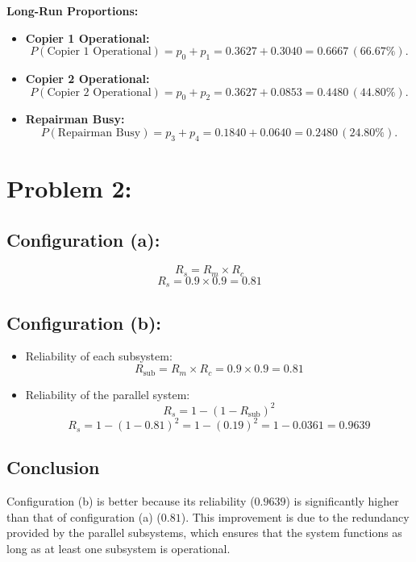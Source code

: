 \documentclass[12pt]{article}
\begin{document}
\textbf{Long-Run Proportions:}
\begin{itemize}
    \item \textbf{Copier 1 Operational:}
    \[
    P(\text{Copier 1 Operational}) = p_0 + p_1 = 0.3627 + 0.3040 = 0.6667 \, (66.67\%).
    \]
    \item \textbf{Copier 2 Operational:}
    \[
    P(\text{Copier 2 Operational}) = p_0 + p_2 = 0.3627 + 0.0853 = 0.4480 \, (44.80\%).
    \]
    \item \textbf{Repairman Busy:}
    \[
    P(\text{Repairman Busy}) = p_3 + p_4 = 0.1840 + 0.0640 = 0.2480 \, (24.80\%).
    \]
\end{itemize}

\section*{Problem 2:}

\subsection*{Configuration (a):}
\[
R_s = R_m \times R_c
\]
\[
R_s = 0.9 \times 0.9 = 0.81
\]

\subsection*{Configuration (b):}
\begin{itemize}
    \item Reliability of each subsystem:
    \[
    R_{\text{sub}} = R_m \times R_c = 0.9 \times 0.9 = 0.81
    \]
    \item Reliability of the parallel system:
    \[
    R_s = 1 - (1 - R_{\text{sub}})^2
    \]
    \[
    R_s = 1 - (1 - 0.81)^2 = 1 - (0.19)^2 = 1 - 0.0361 = 0.9639
    \]
\end{itemize}

\subsection*{Conclusion}
Configuration (b) is better because its reliability (\(0.9639\)) is significantly higher than that of configuration (a) (\(0.81\)). This improvement is due to the redundancy provided by the parallel subsystems, which ensures that the system functions as long as at least one subsystem is operational.
\end{document}

